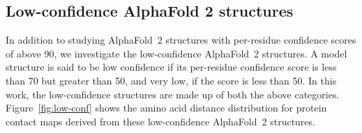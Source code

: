 \documentclass[10pt]{iopart}
\begin{document}
\begin{figure}[htb]
\end{figure}

\subsection{Low-confidence AlphaFold 2 structures}

In addition to studying AlphaFold~2 structures with per-residue confidence scores of above 90, we investigate the low-confidence AlphaFold~2 structures. A model structure is said to be low confidence if its per-residue confidence score is less than 70 but greater than 50, and very low, if the score is less than 50. In this work, the low-confidence structures are made up of both the above categories. Figure~\ref{fig:low-conf} shows the amino acid distance distribution for protein contact maps derived from these low-confidence AlphaFold~2 structures. 
\end{document}
